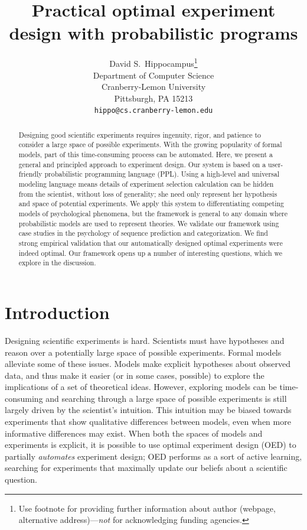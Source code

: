 \documentclass{article}
\title{Practical optimal experiment design with probabilistic programs}
\author{
  David S.~Hippocampus\thanks{Use footnote for providing further
    information about author (webpage, alternative
    address)---\emph{not} for acknowledging funding agencies.} \\
  Department of Computer Science\\
  Cranberry-Lemon University\\
  Pittsburgh, PA 15213 \\
  \texttt{hippo@cs.cranberry-lemon.edu} \\
}
\newcommand{\ndg}[1]{\textcolor{Green}{[ndg: #1]}}
\newcommand{\mht}[1]{\textcolor{Blue}{[mht: #1]}}
\newcommand{\lou}[1]{\textcolor{orange}{[lou: #1]}}
\begin{document}

\maketitle

\begin{abstract}

Designing good scientific experiments requires ingenuity, rigor, and patience to consider a large space of possible experiments.
With the growing popularity of formal models, part of this time-consuming process can be automated.
Here, we present a general and principled approach to experiment design.
Our system is based on a user-friendly probabilistic programming language (PPL).
Using a high-level and universal modeling language means details of experiment selection calculation can be hidden from the scientist, without loss of generality; she need only represent her hypothesis and space of potential experiments.
We apply this system to differentiating competing models of psychological phenomena, but the framework is general to any domain where probabilistic models are used to represent theories.
We validate our framework using case studies in the psychology of sequence prediction and categorization.
We find strong empirical validation that our automatically designed optimal experiments were indeed optimal.
Our framework opens up a number of interesting questions, which we explore in the discussion.


\end{abstract}


\section{Introduction}
Designing scientific experiments is hard.
Scientists must have hypotheses and reason over a potentially large space of possible experiments.
Formal models alleviate some of these issues.
Models make explicit hypotheses about observed data, and thus make it easier (or in some cases, possible) to explore the implications of a set of theoretical ideas.
However, exploring models can be time-consuming and searching through a large space of possible experiments is still largely driven by the scientist's intuition.
This intuition may be biased towards experiments that show qualitative differences between models, even when more informative differences may exist.
When both the spaces of models and experiments is explicit, it is possible to use optimal experiment design (OED) to partially \emph{automates} experiment design; OED performs as a sort of active learning, searching for experiments that maximally update our beliefs about a scientific question.
\end{document}
